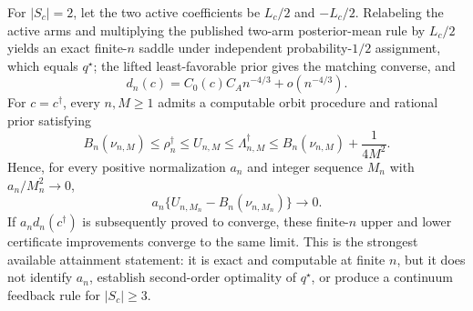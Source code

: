 For \(|S_c|=2\), let the two active coefficients be \(L_c/2\) and \(-L_c/2\). Relabeling the active arms and multiplying the published two-arm posterior-mean rule by \(L_c/2\) yields an exact finite-\(n\) saddle under independent probability-\(1/2\) assignment, which equals \(q^\star\); the lifted least-favorable prior gives the matching converse, and \[d_n(c)=C_0(c)C_A n^{-4/3}+o(n^{-4/3}).\] For \(c=c^\dagger\), every \(n,M\geq1\) admits a computable orbit procedure and rational prior satisfying \[B_n(\nu_{n,M})\leq\rho_n^\dagger\leq U_{n,M}\leq\Lambda_{n,M}^\dagger\leq B_n(\nu_{n,M})+\frac{1}{4M^2}.\] Hence, for every positive normalization \(a_n\) and integer sequence \(M_n\) with \(a_n/M_n^2\to0\), \[a_n\{U_{n,M_n}-B_n(\nu_{n,M_n})\}\longrightarrow0.\] If \(a_nd_n(c^\dagger)\) is subsequently proved to converge, these finite-\(n\) upper and lower certificate improvements converge to the same limit. This is the strongest available attainment statement: it is exact and computable at finite \(n\), but it does not identify \(a_n\), establish second-order optimality of \(q^\star\), or produce a continuum feedback rule for \(|S_c|\geq3\).